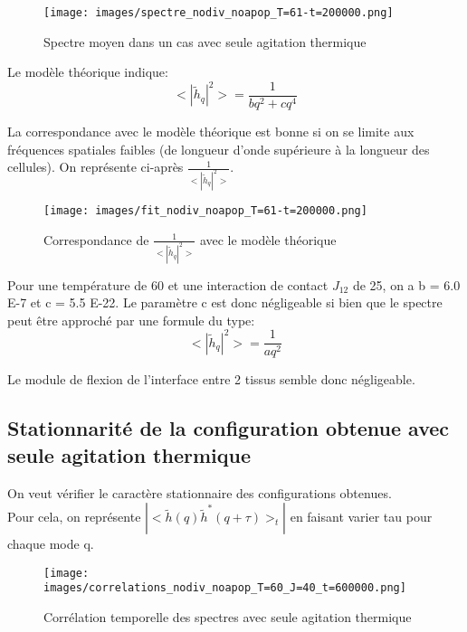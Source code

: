 \documentclass[11pt,a4paper]{article}
\begin{document}
\begin{figure}[H]
\begin{center}
\texttt{[image: images/spectre\_nodiv\_noapop\_T=61-t=200000.png]}
\caption{Spectre moyen dans un cas avec seule agitation thermique}
\label{mafigure}
\end{center}
\end{figure}

Le modèle théorique indique:
\begin{equation}
<|{\tilde{h}_q}|^{2}> = \frac{1}{bq^{2} + cq^{4}}
\end{equation}


La correspondance avec le modèle théorique est bonne si on se limite aux fréquences spatiales faibles (de longueur d'onde supérieure à la longueur des cellules). On représente ci-après $\frac{1}{<|{\tilde{h}_q}|^{2}>}$.

\begin{figure}[H]
\begin{center}
\texttt{[image: images/fit\_nodiv\_noapop\_T=61-t=200000.png]}
\caption{Correspondance de $\frac{1}{<|{\tilde{h}_q}|^{2}>}$ avec le modèle théorique}
\label{mafigure}
\end{center}
\end{figure}

Pour une température de 60 et une interaction de contact $J_{12}$ de 25, on a b = 6.0 E-7 et c = 5.5 E-22.
Le paramètre c est donc négligeable si bien que le spectre peut être approché par une formule du type:
\begin{equation}
<|{\tilde{h}_q}|^{2}> = \frac{1}{aq^{2}}
\end{equation}

Le module de flexion de l'interface entre 2 tissus semble donc négligeable.


\subsection{Stationnarité de la configuration obtenue avec seule agitation thermique}

On veut vérifier le caractère stationnaire des configurations obtenues. \\

Pour cela, on représente $|<\tilde{h}(q) {\tilde{h}}^*(q+\tau)>_t|$ en faisant varier tau pour chaque mode q.\\


\begin{figure}[H]
\begin{center}
\texttt{[image: images/correlations\_nodiv\_noapop\_T=60\_J=40\_t=600000.png]}
\caption{Corrélation temporelle des spectres avec seule agitation thermique}
\label{mafigure}
\end{center}
\end{figure}
\end{document}
